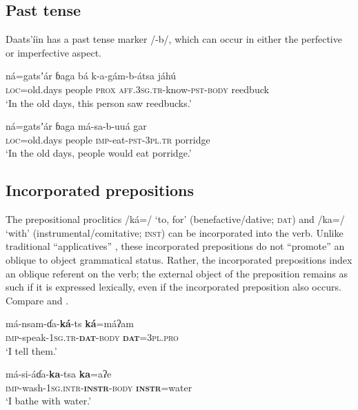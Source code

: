 \documentclass[output=paper]{langsci/langscibook}
\begin{document}
\subsection{Past tense}\label{sec:ahlandc:4.4}

Daats’íin has a past tense marker /-b/, which can occur in either the perfective  or imperfective  aspect.

\ea\label{ex:ahlandc:21}
\gll
ná=gatsʼár       ɓaga      bá  k-a-gám-b-átsa   jáhú \\
\textsc{loc}=old.days  people   \textsc{prox}   \textsc{aff.3sg.tr}{}-know-\textsc{pst-body}  reedbuck \\
\glt
‘In the old days, this person saw reedbucks.’
\z

\ea\label{ex:ahlandc:22}
\gll
ná=gatsʼár       ɓaga    má-sa-b-uuá  gar \\
\textsc{loc}=old.days   people \textsc{imp}{}-eat-\textsc{pst}{}-\textsc{3pl.tr}  porridge \\
\glt
‘In the old days, people would eat porridge.’
\z


\subsection{Incorporated prepositions}\label{sec:ahlandc:4.5}

The prepositional proclitics /ká=/ ‘to, for’ (benefactive/dative; \textsc{dat}) and /ka=/ ‘with’ (instrumental/comitative; \textsc{inst}) can be incorporated into the verb. Unlike traditional “applicatives” \citep{Payne1997}, these incorporated prepositions do not “promote” an oblique to object grammatical status. Rather, the incorporated prepositions index an oblique referent on the verb; the external object of the preposition remains as such if it is expressed lexically, even if the incorporated preposition also occurs. Compare  and . 

\ea\label{ex:ahlandc:23}
\gll
má-nsam-ɗa-\textbf{ká}{}-ts                      \textbf{ká}=máʔam \\
\textsc{imp}{}-speak-\textsc{1sg.tr-}\textbf{\textsc{dat}}\textsc{{}-body} \textbf{\textsc{dat}}\textsc{=3pl.pro} \\
\glt
‘I tell them.’
\z

\ea\label{ex:ahlandc:24}
\gll
má-si-áɗa-\textbf{ka}{}-tsa    \textbf{ka}=aʔe \\
\textsc{imp}{}-wash-\textsc{1sg.intr-}\textbf{\textsc{instr}}\textsc{{}-body} \textbf{\textsc{instr}}\textsc{=}water   \\
\glt
‘I bathe with water.’
\z
\end{document}
